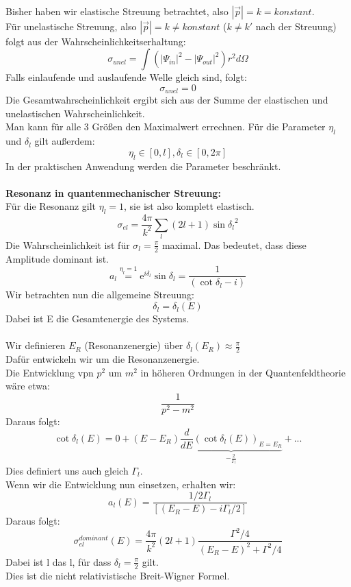 \\
Bisher haben wir elastische Streuung betrachtet, also $\left| \vec{p} \right| = 
k = \mathit{konstant}$. \\
Für unelastische Streuung, also $\left| \vec{p} \right| = k \ne 
\mathit{konstant}$ ($k \ne k'$ nach der Streuung) folgt aus der 
Wahrscheinlichkeitserhaltung: 
\[ \sigma_{unel} = \int \left( {\left| \Psi_{in} \right|}^2 - {\left| 
\Psi_{out} \right|}^2 \right) r^2 d\Omega \]
Falls einlaufende und auslaufende Welle gleich sind, folgt:
\[ \sigma_{unel} = 0 \]
Die Gesamtwahrscheinlichkeit ergibt sich aus der Summe der elastischen und 
unelastischen Wahrscheinlichkeit. \\
Man kann für alle 3 Größen den Maximalwert errechnen. 
Für die Parameter $\eta_l$ und $\delta_l$ gilt außerdem:
\[ \eta_l \in [0, l] , \delta_l \in [0, 2\pi] \]
In der praktischen Anwendung werden die Parameter beschränkt. \\
\\
\textbf{Resonanz in quantenmechanischer Streuung:} \\
Für die Resonanz gilt $\eta_l = 1$, sie ist also komplett elastisch. 
\[ \sigma_{el} = \frac{4\pi}{k^2} \sum_l (2l +1) \sin{\delta_l}^2 \]
Die Wahrscheinlichkeit ist für $\sigma_l = \frac{\pi}{2}$ maximal. Das 
bedeutet, dass diese Amplitude dominant ist.
\[ a_l \stackrel{\eta_l =1}= \mathrm{e}^{i\delta_l} \sin{\delta_l} = 
\frac{1}{(\cot \delta_l - i)} \] 
Wir betrachten nun die allgemeine Streuung: 
\[ \delta_l = \delta_l (E) \]
Dabei ist E die Gesamtenergie des Systems. \\ 
\\
Wir definieren $E_R$ (Resonanzenergie) über $\delta_l (E_R) \approx 
\frac{\pi}{2} $ \\
Dafür entwickeln wir um die Resonanzenergie. \\
Die Entwicklung vpn $p^2$ um $m^2$ in höheren Ordnungen in der 
Quantenfeldtheorie wäre etwa: 
\[ \frac{1}{p^2 - m^2} \]
Daraus folgt:
\[ \cot \delta_l (E) = 0 + (E -E_R) \underbrace{\frac{d}{dE} (\cot \delta_l 
(E))_{E = E_R}}_{-\frac{2}{\Gamma_l}} + ... \]
Dies definiert uns auch gleich $\Gamma_l$. \\
Wenn wir die Entwicklung nun einsetzen, erhalten wir: 
\[ a_l (E) = \frac{1/2 \Gamma_l}{\left[ (E_R -E) - i \Gamma_l /2 \right]} \]
Daraus folgt: 
\[ \sigma_{el}^{dominant} (E) = \frac{4\pi}{k^2} (2l + 1) \frac{\Gamma^2 / 
4}{(E_R - E)^2 + \Gamma^2 / 4} \]
Dabei ist l das l, für dass $\delta_l = \frac{\pi}{2} $ gilt. \\
Dies ist die nicht relativistische Breit-Wigner Formel. \\
